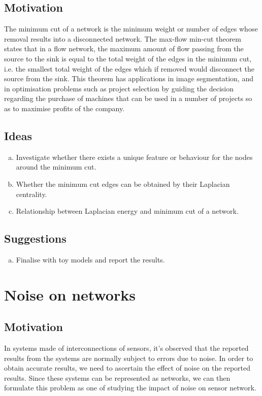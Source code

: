 \documentclass[10pt,a4paper]{article}
\begin{document}
	\subsection{Motivation}
	The minimum cut of a network is the minimum weight or number of edges whose removal results into a disconnected network. The max-flow min-cut theorem states that in a flow network, the maximum amount of flow passing from the source to the sink is equal to the total weight of the edges in the minimum cut, i.e. the smallest total weight of the edges which if removed would disconnect the source from the sink. This theorem has applications in image segmentation, and in optimisation problems such as project selection by guiding the decision regarding the purchase of machines that can be used in a number of projects so as to maximise profits of the company.
	\subsection{Ideas}
	\begin{enumerate}[a)]
	\item Investigate whether there exists a unique feature or behaviour for the nodes around the minimum cut.
	\item Whether the minimum cut edges can be obtained by their Laplacian centrality.
	\item  Relationship between Laplacian energy and minimum cut of a network.
	\end{enumerate}
    \subsection{Suggestions}
    
    \begin{enumerate}[a)]
    	\item  Finalise with toy models and report the results.
    \end{enumerate}
	\section{Noise on networks}
	\subsection{Motivation}
	In systems made of interconnections of sensors, it's observed that the reported results from  the systems are normally subject to errors due to noise. In order to obtain accurate results, we need to ascertain the effect of noise on the reported results. Since these systems can be represented as networks, we can then formulate this problem as one of studying the impact of noise on sensor network. 
\end{document}
